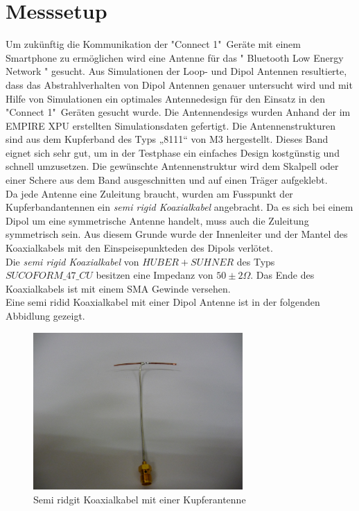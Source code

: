 \section{Messsetup}
Um zukünftig die Kommunikation der "Connect 1"\   Geräte mit einem Smartphone zu ermöglichen wird eine Antenne für das " Bluetooth Low Energy Network " gesucht. Aus Simulationen der Loop- und Dipol Antennen resultierte, dass das Abstrahlverhalten von Dipol Antennen genauer untersucht wird und mit Hilfe von Simulationen ein optimales Antennedesign für den Einsatz in den "Connect 1"\  Geräten gesucht wurde. 
Die Antennendesigs wurden Anhand der im EMPIRE XPU erstellten Simulationsdaten gefertigt. Die Antennenstrukturen sind aus dem Kupferband des Typs „8111“ von M3 hergestellt. Dieses Band eignet sich sehr gut, um in der Testphase ein einfaches Design kostgünstig und schnell umzusetzen. Die gewünschte Antennenstruktur wird dem Skalpell oder einer Schere aus dem Band ausgeschnitten und auf einen Träger aufgeklebt. \\
Da jede Antenne eine Zuleitung braucht, wurden am Fusspunkt der Kupferbandantennen ein \textit{semi rigid Koaxialkabel} angebracht. Da es sich bei einem Dipol um eine symmetrische Antenne handelt, muss auch die Zuleitung symmetrisch sein. Aus diesem Grunde wurde der Innenleiter und der Mantel des Koaxialkabels mit den Einspeisepunkteden des Dipols verlötet.\\
Die \textit{semi rigid Koaxialkabel} von $HUBER+SUHNER$ des Typs $SUCOFORM\_47\_CU$ besitzen eine Impedanz von $50  \pm 2\Omega$. Das Ende des Koaxialkabels ist mit einem SMA Gewinde versehen.\\

Eine semi ridid Koaxialkabel mit einer Dipol Antenne ist in der folgenden Abbidlung gezeigt.
\begin{figure}[!h]
	\centering
	\includegraphics[width=8cm]{content/bilder/Implementierung/KoaxMitAntenne.JPG}%
	\caption{Semi ridgit Koaxialkabel mit einer Kupferantenne}
	\label{fig:KoaxMitAntenne}
\end{figure}

